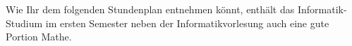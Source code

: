 Wie Ihr dem folgenden Stundenplan entnehmen könnt, enthält das Informatik-Studium im ersten
Semester neben der Informatikvorlesung auch eine gute Portion Mathe.

\begin{center}



\end{center}
